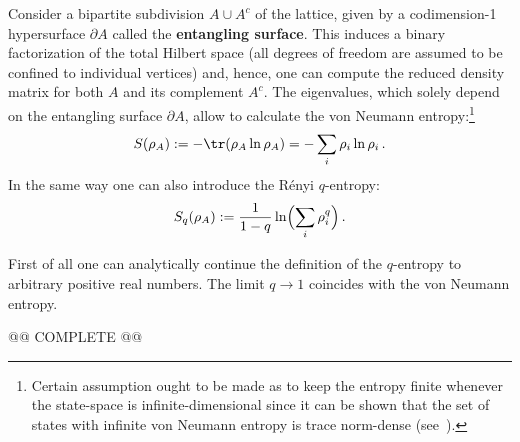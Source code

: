     Consider a bipartite subdivision $A\cup A^c$ of the lattice, given by a codimension-1 hypersurface $\partial A$ called the \textbf{entangling surface}. This induces a binary factorization of the total Hilbert space (all degrees of freedom are assumed to be confined to individual vertices) and, hence, one can compute the reduced density matrix for both $A$ and its complement $A^c$. The eigenvalues, which solely depend on the entangling surface $\partial A$, allow to calculate the von Neumann entropy:\footnote{Certain assumption ought to be made as to keep the entropy finite whenever the state-space is infinite-dimensional since it can be shown that the set of states with infinite von Neumann entropy is trace norm-dense (see~\citet{eisert_quantification_2002}).}
    \begin{gather}
        S(\rho_A) := -\tr(\rho_A\ln\rho_A) = -\sum_i\rho_i\ln\rho_i\,.
    \end{gather}
    In the same way one can also introduce the R\'enyi $q$-entropy:
    \begin{gather}
        S_q(\rho_A) := \frac{1}{1-q}\ln\Bigl(\sum_i\rho_i^q\Bigr)\,.
    \end{gather}
    \begin{property}
         First of all one can analytically continue the definition of the $q$-entropy to arbitrary positive real numbers. The limit $q\longrightarrow1$ coincides with the von Neumann entropy.
    \end{property}

    @@ COMPLETE @@